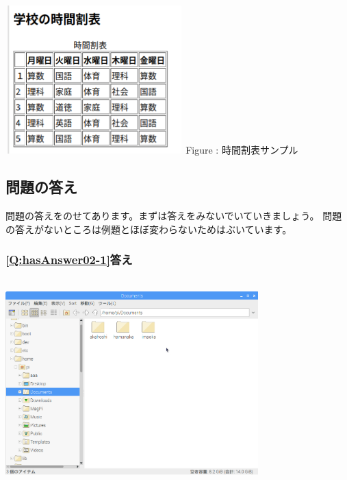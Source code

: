 \documentclass[a4paper,12pt]{jarticle}
\begin{document}
\begin{minipage}{6.839cm}
  {\upshape
    \includegraphics[width=6.839cm,height=5.727cm]{textbook-img211.png}
    \newline
    Figure {\theFigure\label{seq:refFigure45}}:
    時間割表サンプル}
\end{minipage}

\bigskip

\flushleft
\clearpage\subsection{\bfseries
  問題の答え}

問題の答えをのせてあります。まずは答えをみないでいていきましょう。\newline
問題の答えがないところは例題とほぼ変わらないためはぶいています。

\subsubsection{\bfseries
  \ref*{Q:hasAnswer02-1}答え}

\bigskip


\centering
\includegraphics[width=9.763cm,height=8.038cm]{textbook-img212.png}
\flushleft
\end{document}
